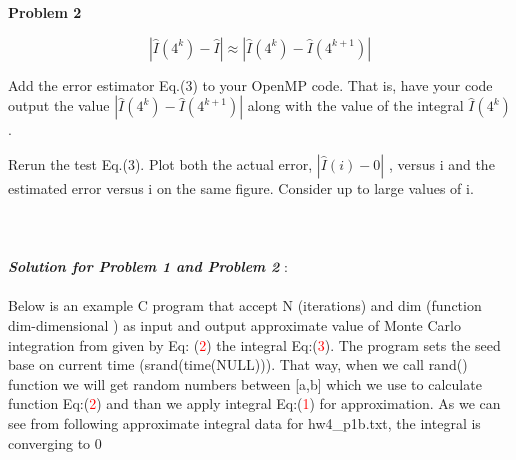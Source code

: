 \documentclass{article}
\begin{document}
{\bf Problem 2}

\begin{equation} \label{exp:eq0}
| \hat{I}(4^k) - \hat{I} | \approx  | \hat{I}(4^k) - \hat{I}(4^{k+1}) | 
\end{equation}


Add the error estimator Eq.(3) to your OpenMP code. That is, have your code output the value $|\hat{I}(4^k)-\hat{I}(4^{k+1})|$ 
along with the value of the integral $ \hat{I}(4^k) $.

Rerun the test Eq.(3). Plot both the actual error,   $ | \hat{I}(i) - 0 | $ , versus i and the estimated error versus i on 
the same figure. Consider up to large values of i.
\\
\\
\\
\\
\textbf{\textit{Solution for Problem 1 and Problem 2}} :
\\
\\
Below is an example C program that accept N (iterations) and dim (function dim-dimensional )  as input and output  approximate value of Monte Carlo integration from given by Eq: (\textcolor{red}{2}) the integral Eq:(\textcolor{red}{3}). The program sets the seed base on current time (srand(time(NULL))). That way, when we call rand() function we will get random numbers between [a,b] which we  use to calculate function Eq:(\textcolor{red}{2}) and than we apply integral Eq:(\textcolor{red}{1}) for approximation. As we can see from following approximate integral data for hw4\_p1b.txt, the integral is converging to 0 

\newpage
\end{document}
